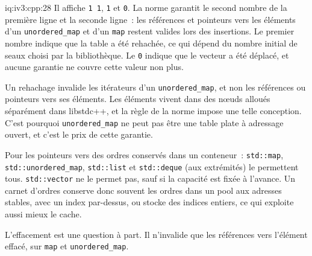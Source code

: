 \begin{solution}{iq:iv3:cpp:28}
Il affiche \texttt{1 1}, \texttt{1} et \texttt{0}. La norme garantit le second nombre de la première ligne et la seconde ligne~: les références et pointeurs vers les éléments d'un \texttt{unordered\_map} et d'un \texttt{map} restent valides lors des insertions. Le premier nombre indique que la table a été rehachée, ce qui dépend du nombre initial de seaux choisi par la bibliothèque. Le \texttt{0} indique que le vecteur a été déplacé, et aucune garantie ne couvre cette valeur non plus.

Un rehachage invalide les itérateurs d'un \texttt{unordered\_map}, et non les références ou pointeurs vers ses éléments. Les éléments vivent dans des nœuds alloués séparément dans libstdc++, et la règle de la norme impose une telle conception. C'est pourquoi \texttt{unordered\_map} ne peut pas être une table plate à adressage ouvert, et c'est le prix de cette garantie.

Pour les pointeurs vers des ordres conservés dans un conteneur~: \texttt{std::map}, \texttt{std::unordered\_map}, \texttt{std::list} et \texttt{std::deque} (aux extrémités) le permettent tous. \texttt{std::vector} ne le permet pas, sauf si la capacité est fixée à l'avance. Un carnet d'ordres conserve donc souvent les ordres dans un pool aux adresses stables, avec un index par-dessus, ou stocke des indices entiers, ce qui exploite aussi mieux le cache.

L'effacement est une question à part. Il n'invalide que les références vers l'élément effacé, sur \texttt{map} et \texttt{unordered\_map}.

\end{solution}

